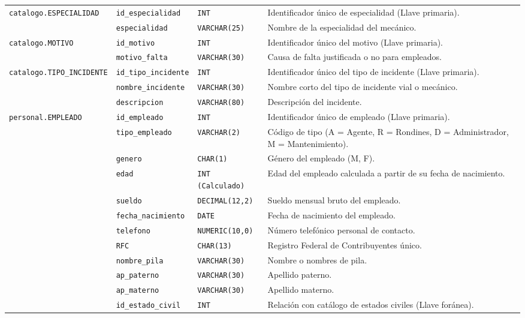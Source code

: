 \begin{longtable}{|p{3.2cm}|p{2.7cm}|p{3.0cm}|p{6.0cm}|}
	\texttt{catalogo.ESPECIALIDAD} & \texttt{id\_especialidad} & \texttt{INT} & Identificador único de especialidad (Llave primaria). \\ \cline{2-4}
	& \texttt{especialidad} & \texttt{VARCHAR(25)} & Nombre de la especialidad del mecánico. \\ \hline
	
	\texttt{catalogo.MOTIVO} & \texttt{id\_motivo} & \texttt{INT} & Identificador único del motivo (Llave primaria). \\ \cline{2-4}
	& \texttt{motivo\_falta} & \texttt{VARCHAR(30)} & Causa de falta justificada o no para empleados. \\ \hline
	
	\texttt{catalogo.TIPO\_INCIDENTE} & \texttt{id\_tipo\_incidente} & \texttt{INT} & Identificador único del tipo de incidente (Llave primaria). \\ \cline{2-4}
	& \texttt{nombre\_incidente} & \texttt{VARCHAR(30)} & Nombre corto del tipo de incidente vial o mecánico. \\ \cline{2-4}
	& \texttt{descripcion} & \texttt{VARCHAR(80)} & Descripción del incidente. \\ \hline
	
	\texttt{personal.EMPLEADO} & \texttt{id\_empleado} & \texttt{INT} & Identificador único de empleado (Llave primaria). \\ \cline{2-4}
	& \texttt{tipo\_empleado} & \texttt{VARCHAR(2)} & Código de tipo (A = Agente, R = Rondines, D = Administrador, M = Mantenimiento). \\ \cline{2-4}
	& \texttt{genero} & \texttt{CHAR(1)} & Género del empleado (M, F). \\ \cline{2-4}
	& \texttt{edad} & \texttt{INT (Calculado)} & Edad del empleado calculada a partir de su fecha de nacimiento. \\ \cline{2-4}
	& \texttt{sueldo} & \texttt{DECIMAL(12,2)} & Sueldo mensual bruto del empleado. \\ \cline{2-4}
	& \texttt{fecha\_nacimiento} & \texttt{DATE} & Fecha de nacimiento del empleado. \\ \cline{2-4}
	& \texttt{telefono} & \texttt{NUMERIC(10,0)} & Número telefónico personal de contacto. \\ \cline{2-4}
	& \texttt{RFC} & \texttt{CHAR(13)} & Registro Federal de Contribuyentes único. \\ \cline{2-4}
	& \texttt{nombre\_pila} & \texttt{VARCHAR(30)} & Nombre o nombres de pila. \\ \cline{2-4}
	& \texttt{ap\_paterno} & \texttt{VARCHAR(30)} & Apellido paterno. \\ \cline{2-4}
	& \texttt{ap\_materno} & \texttt{VARCHAR(30)} & Apellido materno. \\ \cline{2-4}
	& \texttt{id\_estado\_civil} & \texttt{INT} & Relación con catálogo de estados civiles (Llave foránea). \\ \hline
	

\end{longtable}
